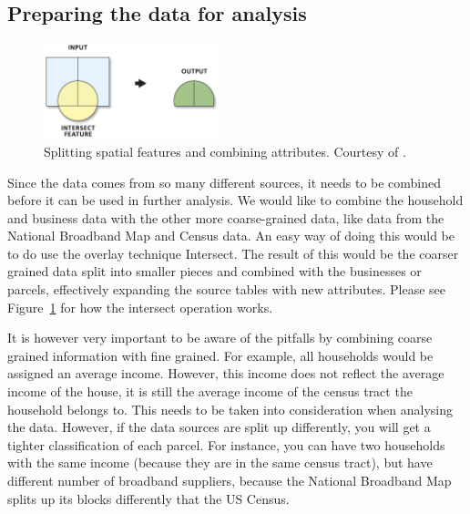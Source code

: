 \documentclass[twocolumn]{article}
\begin{document}
\subsection{Preparing the data for analysis}
\label{sub:GIS operations for combining data}
\begin{figure}
  \centering
  \includegraphics[width=0.45\textwidth]{img/intersect.png}
  \caption{Splitting spatial features and combining attributes. Courtesy of \cite{noauthor_undated-dw}.}
  \label{fig:intersect}
\end{figure}
Since the data comes from so many different sources, it needs to be combined before it can be used in further analysis. We would like to combine the household and business data with the other more coarse-grained data, like data from the National Broadband Map and Census data. An easy way of doing this would be to do use the overlay technique Intersect. The result of this would be the coarser grained data split into smaller pieces and combined with the businesses or parcels, effectively expanding the source tables with new attributes. Please see Figure~\ref{fig:intersect} for how the intersect operation works.

It is however very important to be aware of the pitfalls by combining coarse grained information with fine grained. For example, all households would be assigned an average income. However, this income does not reflect the average income of the house, it is still the average income of the census tract the household belongs to. This needs to be taken into consideration when analysing the data. However, if the data sources are split up differently, you will get a tighter classification of each parcel. For instance, you can have two households with the same income (because they are in the same census tract), but have different number of broadband suppliers, because the National Broadband Map splits up its blocks differently that the US Census.
\end{document}
